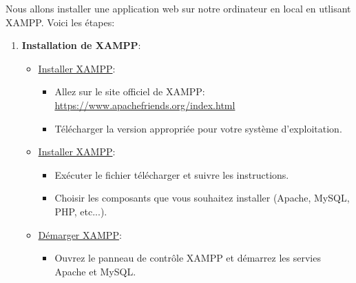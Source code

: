 \documentclass[a4paper,11pt]{article}
\begin{document}
                \bigskip
                \noindent Nous allons installer une application web sur notre ordinateur en local en utlisant XAMPP. 
                Voici les étapes:
                \begin{enumerate}
                    \item \textbf{Installation de XAMPP}:
                        \begin{itemize}
                            \item \underline{Installer XAMPP}:
                                \begin{itemize}
                                    \item Allez sur le site officiel de XAMPP: \url{https://www.apachefriends.org/index.html}
                                    \item Télécharger la version appropriée pour votre système d'exploitation. 
                                \end{itemize}
                            \item \underline{Installer XAMPP}:
                                \begin{itemize}
                                    \item Exécuter le fichier télécharger et suivre les instructions.
                                    \item Choisir les composants que vous souhaitez installer (Apache, MySQL, PHP, etc...).
                                \end{itemize}
                            \item \underline{Démarger XAMPP}:
                                \begin{itemize}
                                    \item Ouvrez le panneau de contrôle XAMPP et démarrez les servies Apache et MySQL.
                                \end{itemize}
                        \end{itemize}


\end{enumerate}
\end{document}
